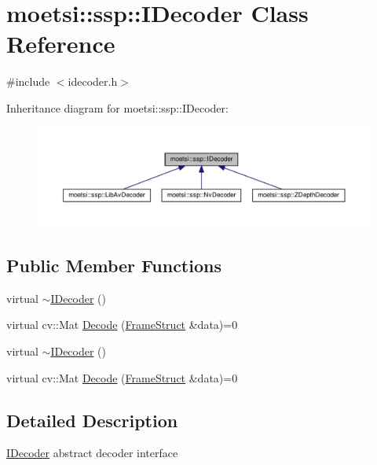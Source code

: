 \hypertarget{classmoetsi_1_1ssp_1_1IDecoder}{}\section{moetsi\+:\+:ssp\+:\+:I\+Decoder Class Reference}
\label{classmoetsi_1_1ssp_1_1IDecoder}


{\ttfamily \#include $<$idecoder.\+h$>$}



Inheritance diagram for moetsi\+:\+:ssp\+:\+:I\+Decoder\+:
\nopagebreak
\begin{figure}[H]
\begin{center}
\leavevmode
\includegraphics[width=350pt]{classmoetsi_1_1ssp_1_1IDecoder__inherit__graph}
\end{center}
\end{figure}
\subsection*{Public Member Functions}
\begin{DoxyCompactItemize}
\item 
virtual \hyperlink{classmoetsi_1_1ssp_1_1IDecoder_a26dc991c2434792f50ec5ae9b61a1653}{$\sim$\+I\+Decoder} ()
\item 
virtual cv\+::\+Mat \hyperlink{classmoetsi_1_1ssp_1_1IDecoder_a1c06604dc4107d3668a4e791c13cc063}{Decode} (\hyperlink{structmoetsi_1_1ssp_1_1FrameStruct}{Frame\+Struct} \&data)=0
\item 
virtual \hyperlink{classmoetsi_1_1ssp_1_1IDecoder_a26dc991c2434792f50ec5ae9b61a1653}{$\sim$\+I\+Decoder} ()
\item 
virtual cv\+::\+Mat \hyperlink{classmoetsi_1_1ssp_1_1IDecoder_a1c06604dc4107d3668a4e791c13cc063}{Decode} (\hyperlink{structmoetsi_1_1ssp_1_1FrameStruct}{Frame\+Struct} \&data)=0
\end{DoxyCompactItemize}


\subsection{Detailed Description}
\hyperlink{classmoetsi_1_1ssp_1_1IDecoder}{I\+Decoder} abstract decoder interface 

